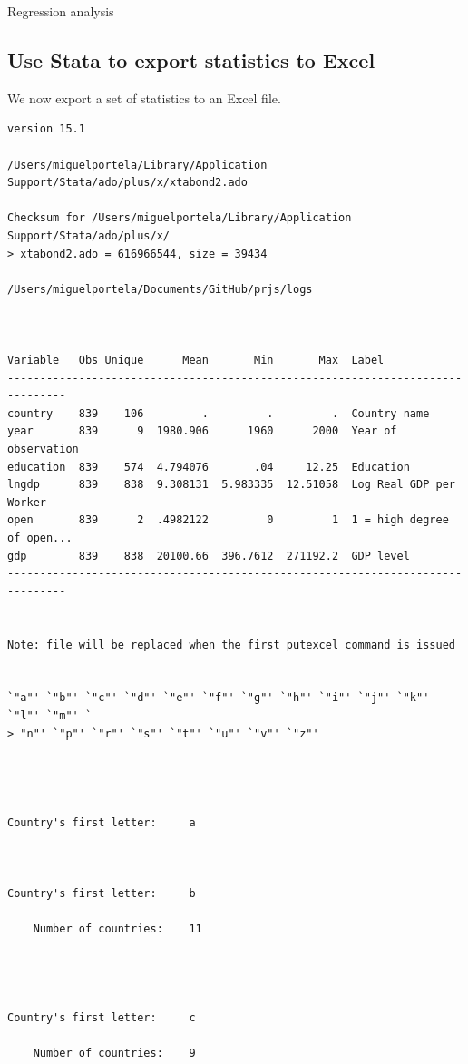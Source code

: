 \documentclass[
  12pt,
]{article}
\begin{document}
\begin{table}[ht]
\caption{Regression analysis}
\label{tab:stata}
  
\end{table}

\hypertarget{use-stata-to-export-statistics-to-excel}{%
\subsection{Use Stata to export statistics to Excel}\label{use-stata-to-export-statistics-to-excel}}

We now export a set of statistics to an Excel file.

\begin{verbatim}
version 15.1

/Users/miguelportela/Library/Application Support/Stata/ado/plus/x/xtabond2.ado

Checksum for /Users/miguelportela/Library/Application Support/Stata/ado/plus/x/
> xtabond2.ado = 616966544, size = 39434

/Users/miguelportela/Documents/GitHub/prjs/logs



Variable   Obs Unique      Mean       Min       Max  Label
-------------------------------------------------------------------------------
country    839    106         .         .         .  Country name
year       839      9  1980.906      1960      2000  Year of observation
education  839    574  4.794076       .04     12.25  Education
lngdp      839    838  9.308131  5.983335  12.51058  Log Real GDP per Worker
open       839      2  .4982122         0         1  1 = high degree of open...
gdp        839    838  20100.66  396.7612  271192.2  GDP level
-------------------------------------------------------------------------------


Note: file will be replaced when the first putexcel command is issued


`"a"' `"b"' `"c"' `"d"' `"e"' `"f"' `"g"' `"h"' `"i"' `"j"' `"k"' `"l"' `"m"' `
> "n"' `"p"' `"r"' `"s"' `"t"' `"u"' `"v"' `"z"'




Country's first letter:     a



Country's first letter:     b

    Number of countries:    11




Country's first letter:     c

    Number of countries:    9





\end{verbatim}
\end{document}
